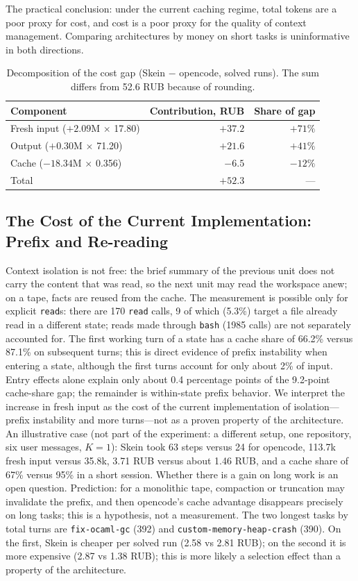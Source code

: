 \documentclass[11pt,a4paper]{article}
\begin{document}
The practical conclusion: under the current caching regime, total tokens are a poor proxy for
cost, and cost is a poor proxy for the quality of context management. Comparing architectures
by money on short tasks is uninformative in both directions.

\begin{table}[t]
\centering
\small
\caption{Decomposition of the cost gap (Skein $-$ opencode, solved runs). The sum differs from
52.6 RUB because of rounding.}
\label{tab:costsplit}
\begin{tabular}{@{}lrr@{}}
\toprule
Component & Contribution, RUB & Share of gap \\
\midrule
Fresh input ($+2.09$M $\times$ 17.80) & $+37.2$ & $+71\%$ \\
Output ($+0.30$M $\times$ 71.20) & $+21.6$ & $+41\%$ \\
Cache ($-18.34$M $\times$ 0.356) & $-6.5$ & $-12\%$ \\
\midrule
Total & $+52.3$ & --- \\
\bottomrule
\end{tabular}
\end{table}

\subsection{The Cost of the Current Implementation: Prefix and Re-reading}

Context isolation is not free: the brief summary of the previous unit does not carry the content
that was read, so the next unit may read the workspace anew; on a tape, facts are reused from
the cache. The measurement is possible only for explicit \texttt{read}s: there are 170 \texttt{read}
calls, 9 of which (5.3\%) target a file already read in a different state; reads made through
\texttt{bash} (1985 calls) are not separately accounted for. The first working turn of a state has a cache share
of 66.2\% versus 87.1\% on subsequent turns; this is direct evidence of prefix instability when
entering a state, although the first turns account for only about 2\% of input. Entry effects alone explain
only about 0.4 percentage points of the 9.2-point cache-share gap; the remainder is within-state
prefix behavior. We interpret the
increase in fresh input as the cost of the current implementation of isolation---prefix
instability and more turns---not as a proven property of the architecture. An illustrative case
(not part of the experiment: a different setup, one repository, six user messages, $K=1$): Skein
took 63 steps versus 24 for opencode, 113.7k fresh input versus 35.8k, 3.71 RUB versus about
1.46 RUB, and a cache share of 67\% versus 95\% in a short session. Whether there is a gain on
long work is an open question. Prediction: for a monolithic tape, compaction or truncation may
invalidate the prefix, and then opencode's cache advantage disappears precisely on long tasks;
this is a hypothesis, not a measurement. The two longest tasks by total turns are
\texttt{fix-ocaml-gc} (392) and \texttt{custom-memory-heap-crash} (390). On the first, Skein is
cheaper per solved run (2.58 vs 2.81 RUB); on the second it is more expensive (2.87 vs 1.38
RUB); this is more likely a selection effect than a property of the architecture.
\end{document}
